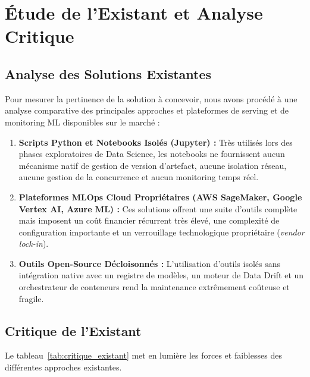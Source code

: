 \documentclass[11pt,a4paper,oneside]{report}
\begin{document}
\section{Étude de l'Existant et Analyse Critique}

\subsection{Analyse des Solutions Existantes}
Pour mesurer la pertinence de la solution à concevoir, nous avons procédé à une analyse comparative des principales approches et plateformes de serving et de monitoring ML disponibles sur le marché :

\begin{enumerate}[leftmargin=0.8cm, itemsep=3pt, topsep=1pt]
    \item \textbf{Scripts Python et Notebooks Isolés (Jupyter) :} Très utilisés lors des phases exploratoires de Data Science, les notebooks ne fournissent aucun mécanisme natif de gestion de version d'artefact, aucune isolation réseau, aucune gestion de la concurrence et aucun monitoring temps réel.
    \item \textbf{Plateformes MLOps Cloud Propriétaires (AWS SageMaker, Google Vertex AI, Azure ML) :} Ces solutions offrent une suite d'outils complète mais imposent un coût financier récurrent très élevé, une complexité de configuration importante et un verrouillage technologique propriétaire (\textit{vendor lock-in}).
    \item \textbf{Outils Open-Source Décloisonnés :} L'utilisation d'outils isolés sans intégration native avec un registre de modèles, un moteur de Data Drift et un orchestrateur de conteneurs rend la maintenance extrêmement coûteuse et fragile.
\end{enumerate}

\newpage
\subsection{Critique de l'Existant}
Le tableau~\ref{tab:critique_existant} met en lumière les forces et faiblesses des différentes approches existantes.
\end{document}
